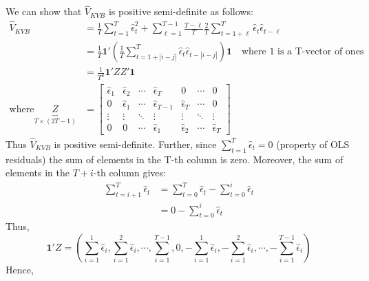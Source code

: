 \documentclass[DIV=14,titlepage=false]{scrreprt}
\begin{document}
    We can show that $\hat V_{KVB}$ is positive semi-definite as follows:
    \begin{align*}
        \hat V_{KVB} &= \frac{1}{T} \sum_{t=1}^{T} \hat \epsilon_t^2 + \sum_{\ell=1}^{T-1}\frac{T-\ell}{T} \frac{2}{T} \sum_{t=1+\ell}^{T} \hat \epsilon_t \hat \epsilon_{t-\ell}\\
        &= \frac{1}{T} \mathbf{1'}\left(\frac{1}{T} \sum_{t=1+|i-j|}^{T} \hat \epsilon_t \hat \epsilon_{t-|i-j|}\right)\mathbf{1}\quad \text{where 1 is a T-vector of ones}\\
        &= \frac{1}{T^2} \mathbf{1'}ZZ'\mathbf{1} \\
        \text{where} \underbrace{Z}_{T \times (2T-1)}&= \begin{bmatrix}
            \hat \epsilon_1 & \hat \epsilon_2 & \cdots & \hat \epsilon_T & 0 & \cdots & 0\\
            0 & \hat \epsilon_1 & \cdots & \hat \epsilon_{T-1} & \hat \epsilon_T & \cdots & 0\\
            \vdots & \vdots & \ddots & \vdots & \vdots & \ddots & \vdots\\
            0 & 0 & \cdots & \hat \epsilon_1 & \hat \epsilon_2 & \cdots & \hat \epsilon_T
        \end{bmatrix}
    \end{align*}
    Thus $\hat V_{KVB}$ is positive semi-definite. Further, since $\sum_{t=1}^{T}\hat\epsilon_t=0$ (property of OLS residuals) the sum of elements in the T-th column is zero. Moreover, the sum of elements in the $T+i$-th column gives:
    \begin{align*}
        \sum_{t=i+1}^{T} \hat \epsilon_t &= \sum_{t=0}^{T} \hat \epsilon_t - \sum_{t=0}^{i} \hat \epsilon_t\\
        &= 0 - \sum_{t=0}^{i} \hat \epsilon_t
    \end{align*}
    Thus,
    \[
        \mathbf{1'}Z = \left( \sum_{i=1}^{1} \hat \epsilon_i, \sum_{i=1}^{2} \hat \epsilon_i, \cdots, \sum_{i=1}^{T-1}, 0, - \sum_{i=1}^{1} \hat \epsilon_i, - \sum _{i=1}^{2} \hat \epsilon_i, \cdots, - \sum_{i=1}^{T-1} \hat \epsilon_i \right)
    \]
    Hence,
\end{document}
